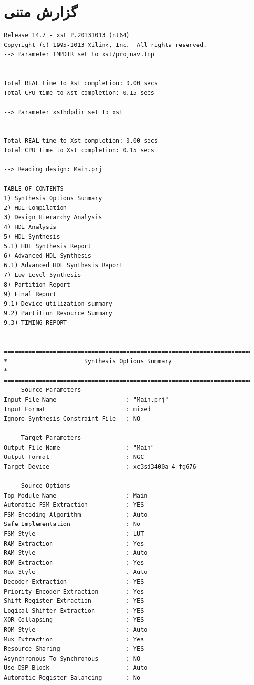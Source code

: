 \documentclass[fleqn]{article}
\begin{document}
\section{گزارش متنی}
\begin{latin}
\begin{lstlisting}[basicstyle=\tiny]
Release 14.7 - xst P.20131013 (nt64)
Copyright (c) 1995-2013 Xilinx, Inc.  All rights reserved.
--> Parameter TMPDIR set to xst/projnav.tmp


Total REAL time to Xst completion: 0.00 secs
Total CPU time to Xst completion: 0.15 secs

--> Parameter xsthdpdir set to xst


Total REAL time to Xst completion: 0.00 secs
Total CPU time to Xst completion: 0.15 secs

--> Reading design: Main.prj

TABLE OF CONTENTS
1) Synthesis Options Summary
2) HDL Compilation
3) Design Hierarchy Analysis
4) HDL Analysis
5) HDL Synthesis
5.1) HDL Synthesis Report
6) Advanced HDL Synthesis
6.1) Advanced HDL Synthesis Report
7) Low Level Synthesis
8) Partition Report
9) Final Report
9.1) Device utilization summary
9.2) Partition Resource Summary
9.3) TIMING REPORT


=========================================================================
*                      Synthesis Options Summary                        *
=========================================================================
---- Source Parameters
Input File Name                    : "Main.prj"
Input Format                       : mixed
Ignore Synthesis Constraint File   : NO

---- Target Parameters
Output File Name                   : "Main"
Output Format                      : NGC
Target Device                      : xc3sd3400a-4-fg676

---- Source Options
Top Module Name                    : Main
Automatic FSM Extraction           : YES
FSM Encoding Algorithm             : Auto
Safe Implementation                : No
FSM Style                          : LUT
RAM Extraction                     : Yes
RAM Style                          : Auto
ROM Extraction                     : Yes
Mux Style                          : Auto
Decoder Extraction                 : YES
Priority Encoder Extraction        : Yes
Shift Register Extraction          : YES
Logical Shifter Extraction         : YES
XOR Collapsing                     : YES
ROM Style                          : Auto
Mux Extraction                     : Yes
Resource Sharing                   : YES
Asynchronous To Synchronous        : NO
Use DSP Block                      : Auto
Automatic Register Balancing       : No


\end{lstlisting}
\end{latin}
\end{document}
